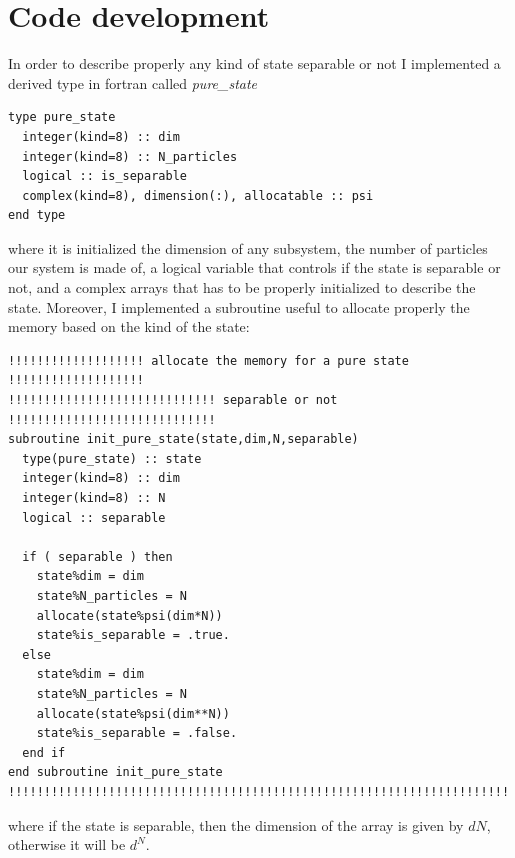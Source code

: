 \documentclass[prb,9pt,notitlepage]{revtex4-1}
\begin{document}
\section{Code development}
In order to describe properly any kind of state separable or not I implemented a derived type in fortran called \textit{pure\_state}
\begin{lstlisting}
type pure_state
  integer(kind=8) :: dim
  integer(kind=8) :: N_particles
  logical :: is_separable
  complex(kind=8), dimension(:), allocatable :: psi
end type

\end{lstlisting}
where it is initialized the dimension of any subsystem, the number of particles our system is made of, a logical variable that controls if the state is separable or not, and a complex arrays that has to be properly initialized to describe the state.
Moreover, I implemented a subroutine useful to allocate properly the memory based on the kind of the state:
\begin{lstlisting}
!!!!!!!!!!!!!!!!!!! allocate the memory for a pure state !!!!!!!!!!!!!!!!!!!
!!!!!!!!!!!!!!!!!!!!!!!!!!!!! separable or not !!!!!!!!!!!!!!!!!!!!!!!!!!!!!
subroutine init_pure_state(state,dim,N,separable)
  type(pure_state) :: state
  integer(kind=8) :: dim
  integer(kind=8) :: N
  logical :: separable

  if ( separable ) then
    state%dim = dim
    state%N_particles = N
    allocate(state%psi(dim*N))
    state%is_separable = .true.
  else
    state%dim = dim
    state%N_particles = N
    allocate(state%psi(dim**N))
    state%is_separable = .false.
  end if
end subroutine init_pure_state
!!!!!!!!!!!!!!!!!!!!!!!!!!!!!!!!!!!!!!!!!!!!!!!!!!!!!!!!!!!!!!!!!!!!!!!!
\end{lstlisting}
where if the state is separable, then the dimension of the array is given by $dN$, otherwise it will be $d^N$.
\end{document}
